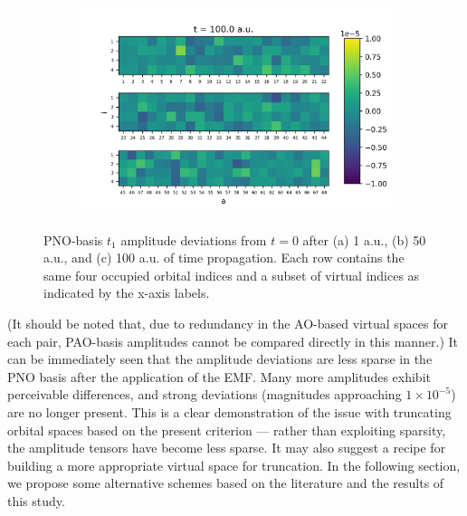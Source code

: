 \begin{figure}
\begin{subfigure}{.5\textwidth}
        \includegraphics[scale=0.5]{p3/figures/PNO_delta_t1_100.png}
        \caption{}
        \label{fig:PNO_t1_100}
    \end{subfigure}
    \caption{PNO-basis $t_1$ amplitude deviations from $t = 0$ after (a) 1 a.u., (b) 50 a.u., and 
    (c) 100 a.u. of time propagation. Each row contains the same four occupied orbital indices
    and a subset of virtual indices as indicated by the x-axis labels.}
    \label{fig:pno_amps}
\end{figure}
(It should be noted that, due to redundancy in the AO-based virtual 
spaces for each pair, PAO-basis amplitudes cannot be compared directly in 
this manner.)
It can be immediately seen that the amplitude deviations
are less sparse in the PNO basis after the application of the EMF. 
Many more amplitudes exhibit
perceivable differences, and strong deviations (magnitudes approaching 
$1\times 10^{-5}$) are no longer present. This is a clear demonstration
of the issue with truncating orbital spaces based on the present criterion ---
rather than exploiting sparsity, the amplitude tensors have become less sparse.
It may also suggest a recipe for building a more appropriate 
virtual space for truncation. 
In the following section, we propose some alternative schemes based on the 
literature and the results of this study.

